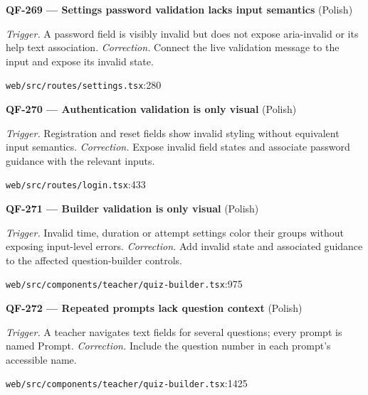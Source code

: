 \begin{minipage}{\linewidth}
\textbf{QF-269 --- Settings password validation lacks input semantics} {\scriptsize\color{accent}(Polish)}\par
\textit{Trigger.} A password field is visibly invalid but does not expose aria-invalid or its help text association. \textit{Correction.} Connect the live validation message to the input and expose its invalid state.\par
{\scriptsize\color{muted}\nolinkurl{web/src/routes/settings.tsx}:280}\par
\end{minipage}\par\vspace{7pt}
\begin{minipage}{\linewidth}
\textbf{QF-270 --- Authentication validation is only visual} {\scriptsize\color{accent}(Polish)}\par
\textit{Trigger.} Registration and reset fields show invalid styling without equivalent input semantics. \textit{Correction.} Expose invalid field states and associate password guidance with the relevant inputs.\par
{\scriptsize\color{muted}\nolinkurl{web/src/routes/login.tsx}:433}\par
\end{minipage}\par\vspace{7pt}
\begin{minipage}{\linewidth}
\textbf{QF-271 --- Builder validation is only visual} {\scriptsize\color{accent}(Polish)}\par
\textit{Trigger.} Invalid time, duration or attempt settings color their groups without exposing input-level errors. \textit{Correction.} Add invalid state and associated guidance to the affected question-builder controls.\par
{\scriptsize\color{muted}\nolinkurl{web/src/components/teacher/quiz-builder.tsx}:975}\par
\end{minipage}\par\vspace{7pt}
\begin{minipage}{\linewidth}
\textbf{QF-272 --- Repeated prompts lack question context} {\scriptsize\color{accent}(Polish)}\par
\textit{Trigger.} A teacher navigates text fields for several questions; every prompt is named Prompt. \textit{Correction.} Include the question number in each prompt's accessible name.\par
{\scriptsize\color{muted}\nolinkurl{web/src/components/teacher/quiz-builder.tsx}:1425}\par
\end{minipage}\par\vspace{7pt}
